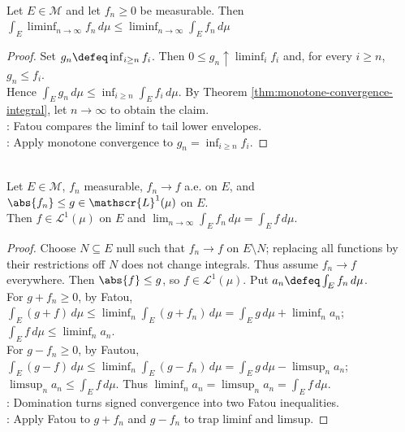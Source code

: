 \begin{theorem} \label{thm:fatou-lemma} \\
Let $E\in\mathcal{M}$ and let $f_n\geq0$ be measurable. Then $\int_E\liminf_{n\to\infty}f_n\,d\mu\leq\liminf_{n\to\infty}\int_Ef_n\,d\mu$
\begin{proof}
Set $g_n\defeq\inf_{i\geq n}f_i$. Then $0\leq g_n\uparrow\liminf_i f_i$ and, for every $i\geq n$, $g_n\leq f_i$.\\
Hence $\int_Eg_n\,d\mu\leq\inf_{i\geq n}\int_Ef_i\,d\mu$. By Theorem \ref{thm:monotone-convergence-integral}, let $n\to\infty$ to obtain the claim.\\
: Fatou compares the liminf to tail lower envelopes.\\
: Apply monotone convergence to $g_n=\inf_{i\geq n}f_i$.
\end{proof}
\end{theorem}

\begin{theorem} \label{thm:dominated-convergence-lebesgue} \\
Let $E\in\mathcal{M}$, $f_n$ measurable, $f_n\to f$ a.e. on $E$, and $\abs{f_n}\leq g\in\mathscr{L}^1(\mu)$ on $E$.\\
Then $f\in\mathscr{L}^1(\mu)$ on $E$ and $\lim_{n\to\infty}\int_Ef_n\,d\mu=\int_Ef\,d\mu$.
\begin{proof}
Choose $N\subseteq E$ null such that $f_n\to f$ on $E\setminus N$; replacing all functions by their restrictions off $N$ does not change integrals. Thus assume $f_n\to f$ everywhere. Then $\abs{f}\leq g$, so $f\in\mathscr{L}^1(\mu)$. Put $a_n\defeq\int_Ef_n\,d\mu$.\\
For $g+f_n\geq0$, by Fatou, $\int_E(g+f)\,d\mu\leq\liminf_n\int_E(g+f_n)\,d\mu =\int_Eg\,d\mu+\liminf_na_n$; $\int_Ef\,d\mu\leq\liminf_na_n$.\\
For $g-f_n\geq0$, by Fautou, $\int_E(g-f)\,d\mu\leq\liminf_n\int_E(g-f_n)\,d\mu=\int_Eg\,d\mu-\limsup_na_n$; $\limsup_na_n\leq\int_Ef\,d\mu$. Thus $\liminf_na_n=\limsup_na_n=\int_Ef\,d\mu$.\\
: Domination turns signed convergence into two Fatou inequalities.\\
: Apply Fatou to $g+f_n$ and $g-f_n$ to trap liminf and limsup.
\end{proof}
\end{theorem}

